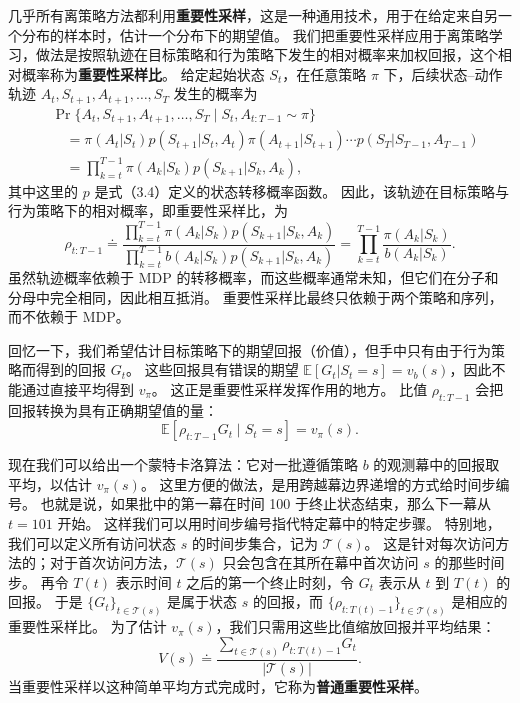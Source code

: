 \documentclass[UTF8,12pt,a4paper,fontset=fandol]{ctexart}
\begin{document}
几乎所有离策略方法都利用\textbf{重要性采样}，这是一种通用技术，用于在给定来自另一个分布的样本时，估计一个分布下的期望值。
我们把重要性采样应用于离策略学习，做法是按照轨迹在目标策略和行为策略下发生的相对概率来加权回报，这个相对概率称为\textbf{重要性采样比}。
给定起始状态 $S_t$，在任意策略 $\pi$ 下，后续状态--动作轨迹 $A_t,S_{t+1},A_{t+1},\ldots,S_T$ 发生的概率为
\[
\begin{aligned}
&\Pr\{A_t,S_{t+1},A_{t+1},\ldots,S_T\mid S_t,A_{t:T-1}\sim\pi\}\\
&\quad = \pi(A_t|S_t)p(S_{t+1}|S_t,A_t)\pi(A_{t+1}|S_{t+1})\cdots p(S_T|S_{T-1},A_{T-1})\\
&\quad = \prod_{k=t}^{T-1}\pi(A_k|S_k)p(S_{k+1}|S_k,A_k),
\end{aligned}
\]
其中这里的 $p$ 是式（3.4）定义的状态转移概率函数。
因此，该轨迹在目标策略与行为策略下的相对概率，即重要性采样比，为
\begin{equation}
\rho_{t:T-1}\doteq
\frac{\prod_{k=t}^{T-1}\pi(A_k|S_k)p(S_{k+1}|S_k,A_k)}
{\prod_{k=t}^{T-1}b(A_k|S_k)p(S_{k+1}|S_k,A_k)}
=\prod_{k=t}^{T-1}\frac{\pi(A_k|S_k)}{b(A_k|S_k)}.
\end{equation}
虽然轨迹概率依赖于 MDP 的转移概率，而这些概率通常未知，但它们在分子和分母中完全相同，因此相互抵消。
重要性采样比最终只依赖于两个策略和序列，而不依赖于 MDP。

回忆一下，我们希望估计目标策略下的期望回报（价值），但手中只有由于行为策略而得到的回报 $G_t$。
这些回报具有错误的期望 $\mathbb{E}[G_t|S_t=s]=v_b(s)$，因此不能通过直接平均得到 $v_\pi$。
这正是重要性采样发挥作用的地方。
比值 $\rho_{t:T-1}$ 会把回报转换为具有正确期望值的量：
\begin{equation}
\mathbb{E}[\rho_{t:T-1}G_t\mid S_t=s]=v_\pi(s).
\end{equation}

现在我们可以给出一个蒙特卡洛算法：它对一批遵循策略 $b$ 的观测幕中的回报取平均，以估计 $v_\pi(s)$。
这里方便的做法，是用跨越幕边界递增的方式给时间步编号。
也就是说，如果批中的第一幕在时间 100 于终止状态结束，那么下一幕从 $t=101$ 开始。
这样我们可以用时间步编号指代特定幕中的特定步骤。
特别地，我们可以定义所有访问状态 $s$ 的时间步集合，记为 $\mathcal{T}(s)$。
这是针对每次访问方法的；对于首次访问方法，$\mathcal{T}(s)$ 只会包含在其所在幕中首次访问 $s$ 的那些时间步。
再令 $T(t)$ 表示时间 $t$ 之后的第一个终止时刻，令 $G_t$ 表示从 $t$ 到 $T(t)$ 的回报。
于是 $\{G_t\}_{t\in\mathcal{T}(s)}$ 是属于状态 $s$ 的回报，而 $\{\rho_{t:T(t)-1}\}_{t\in\mathcal{T}(s)}$ 是相应的重要性采样比。
为了估计 $v_\pi(s)$，我们只需用这些比值缩放回报并平均结果：
\begin{equation}
V(s)\doteq
\frac{\sum_{t\in\mathcal{T}(s)}\rho_{t:T(t)-1}G_t}{|\mathcal{T}(s)|}.
\end{equation}
当重要性采样以这种简单平均方式完成时，它称为\textbf{普通重要性采样}。
\end{document}
